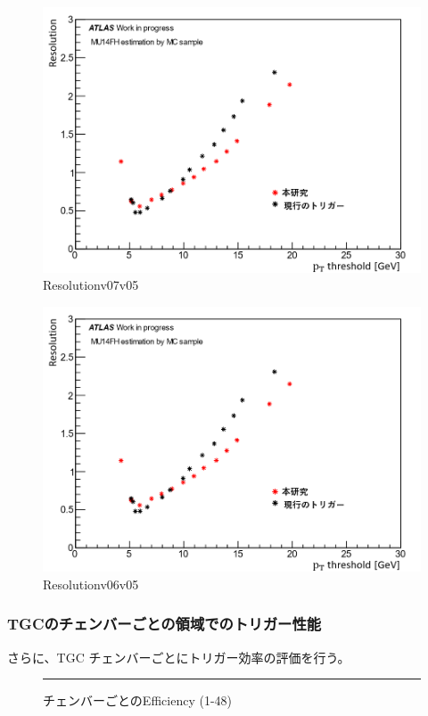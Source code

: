 \begin{figure}[tb]
  \centering
  \includegraphics[clip, width=12cm]{fig/4/resolution_v07_v05.png}
  \caption{Resolutionv07v05}
  \label{fig:Resolution_v07v05}
\end{figure}

\begin{figure}[tb]
  \centering
  \includegraphics[clip, width=12cm]{fig/4/resolution_v07_v05.png}
  \caption{Resolutionv06v05}
  \label{fig:Resolution_v06v05}
\end{figure}

\subsubsection{TGCのチェンバーごとの領域でのトリガー性能}
さらに、TGC チェンバーごとにトリガー効率の評価を行う。
\begin{figure}[tb]
  \centering
  \rule{8cm}{6cm}
  \caption{チェンバーごとのEfficiency (1-48)}
  \label{fig:fit_def}
\end{figure}

